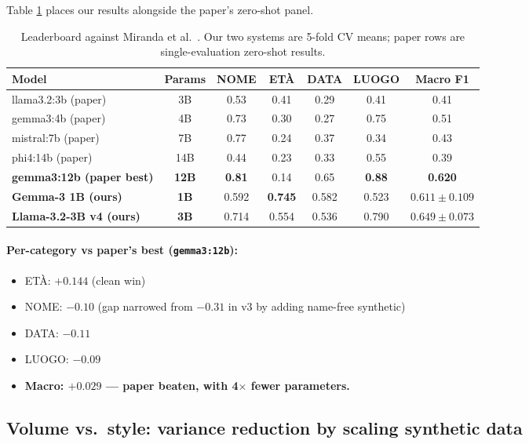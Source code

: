 \documentclass[11pt,a4paper]{article}
\begin{document}
Table \ref{tab:leaderboard} places our results alongside the paper's zero-shot panel.

\begin{table}[h]
\centering
\caption{Leaderboard against Miranda et al.\ \cite{miranda2025mamma}. Our two systems are 5-fold CV means; paper rows are single-evaluation zero-shot results.}
\label{tab:leaderboard}
\begin{tabular}{lcccccc}
\toprule
Model & Params & NOME & ETÀ & DATA & LUOGO & \textbf{Macro F1} \\
\midrule
llama3.2:3b (paper)   & 3B  & 0.53 & 0.41 & 0.29 & 0.41 & 0.41 \\
gemma3:4b (paper)     & 4B  & 0.73 & 0.30 & 0.27 & 0.75 & 0.51 \\
mistral:7b (paper)    & 7B  & 0.77 & 0.24 & 0.37 & 0.34 & 0.43 \\
phi4:14b (paper)      & 14B & 0.44 & 0.23 & 0.33 & 0.55 & 0.39 \\
\textbf{gemma3:12b (paper best)} & \textbf{12B} & \textbf{0.81} & 0.14 & 0.65 & \textbf{0.88} & \textbf{0.620} \\
\midrule
\textbf{Gemma-3 1B (ours)}      & \textbf{1B}  & 0.592 & \textbf{0.745} & 0.582 & 0.523 & $\mathbf{0.611 \pm 0.109}$ \\
\textbf{Llama-3.2-3B v4 (ours)} & \textbf{3B}  & 0.714 & 0.554 & 0.536 & 0.790 & $\mathbf{0.649 \pm 0.073}$ \\
\bottomrule
\end{tabular}
\end{table}

\paragraph{Per-category vs paper's best (\texttt{gemma3:12b}):}
\begin{itemize}[leftmargin=*,topsep=2pt,itemsep=0pt]
\item ETÀ: $+0.144$ (clean win)
\item NOME: $-0.10$ (gap narrowed from $-0.31$ in v3 by adding name-free synthetic)
\item DATA: $-0.11$
\item LUOGO: $-0.09$
\item \textbf{Macro: $+0.029$ — paper beaten, with 4$\times$ fewer parameters.}
\end{itemize}

\subsection{Volume vs.\ style: variance reduction by scaling synthetic data}
\end{document}

